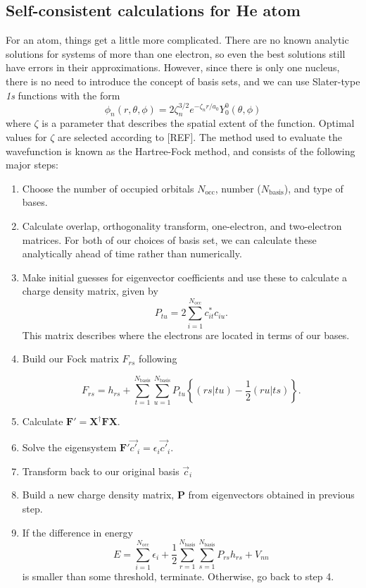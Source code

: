 \documentclass{achemso}
\newcommand{\matr}[1]{\mathbf{#1}}
\begin{document}
\subsection{Self-consistent calculations for He atom}
For an  atom, things get a little more complicated.  There are no known analytic solutions for systems of more than one electron, so even the best solutions still have errors in their approximations.  However, since there is only one nucleus, there is no need to introduce the concept of basis sets, and we can use Slater-type \textit{1s} functions with the form 
\begin{equation}
	\phi_n(r,\theta,\phi) = 2\zeta_n^{3/2}e^{-\zeta_nr/a_0}Y_0^0(\theta,\phi)
\end{equation}
where $\zeta$ is a parameter that describes the spatial extent of the function.  Optimal values for $\zeta$ are selected according to [REF].  The method used to evaluate the wavefunction is known as the Hartree-Fock method, and consists of the following major steps:
\begin{enumerate}
	\item Choose the number of occupied orbitals $N_\mathrm{occ}$, number ($N_\mathrm{basis}$), and type of bases.
	\item Calculate overlap, orthogonality transform, one-electron, and two-electron matrices.  For both of our choices of basis set, we can calculate these analytically ahead of time rather than numerically.
	\item Make initial guesses for eigenvector coefficients and use these to calculate a charge density matrix, given by
\begin{equation}
	P_{tu} = 2 \sum_{i=1}^{N_{\mathrm{occ}}}c^*_{it}c_{iu}.
\end{equation}
	This matrix describes where the electrons are located in terms of our bases.
	\item Build our Fock matrix $F_{rs}$ following

\begin{equation}
	F_{rs} = h_{rs} + \sum_{t=1}^{N_\mathrm{basis}}\sum_{u=1}^{N_\mathrm{basis}}P_{tu}\left\{(rs|tu) -\frac{1}{2}(ru|ts)\right\}.
\end{equation}
	\item Calculate $\matr{F}' = \matr{X}^\dag\matr{F}\matr{X}$.
	\item Solve the eigensystem $\matr{F}'\vec{c'}_i=\epsilon_i\vec{c'}_i$.
	\item Transform back to our original basis $\vec{c}_i$
	\item Build a new charge density matrix, $\matr{P}$ from eigenvectors obtained in previous step.
	\item If the difference in energy 
\begin{equation}
	E = \sum_{i=1}^{N_\mathrm{occ}}\epsilon_i + \frac{1}{2} \sum_{r=1}^{N_\mathrm{basis}} \sum_{s=1}^{N_\mathrm{basis}}P_{rs}h_{rs}+V_{nn}
	\label{eq:hf_energy}
\end{equation}
is smaller than some threshold, terminate.  Otherwise, go back to step 4.
\end{enumerate}
\end{document}
